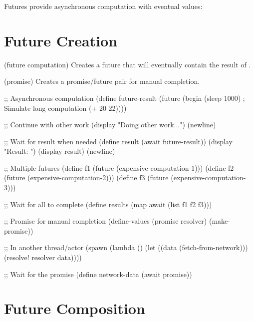 
Futures provide asynchronous computation with eventual values:

\section{Future Creation}
\label{sec:future-creation}

\begin{syntaxspec}{(future computation)}
Creates a future that will eventually contain the result of .
\end{syntaxspec}

\begin{syntaxspec}{(promise)}
Creates a promise/future pair for manual completion.
\end{syntaxspec}

\begin{example}[Futures]
\begin{lambdustcode}
;; Asynchronous computation
(define future-result 
  (future 
    (begin 
      (sleep 1000)    ; Simulate long computation
      (+ 20 22))))

;; Continue with other work
(display "Doing other work...") (newline)

;; Wait for result when needed
(define result (await future-result))
(display "Result: ") (display result) (newline)

;; Multiple futures
(define f1 (future (expensive-computation-1)))
(define f2 (future (expensive-computation-2)))  
(define f3 (future (expensive-computation-3)))

;; Wait for all to complete
(define results (map await (list f1 f2 f3)))

;; Promise for manual completion
(define-values (promise resolver) (make-promise))

;; In another thread/actor
(spawn 
  (lambda () 
    (let ((data (fetch-from-network)))
      (resolve! resolver data))))

;; Wait for the promise
(define network-data (await promise))
\end{lambdustcode}
\end{example}

\section{Future Composition}
\label{sec:future-composition}

